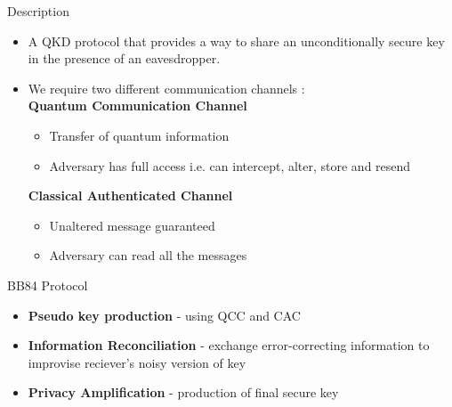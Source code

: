 \documentclass{beamer}
\begin{document}
\begin{frame}{Description}
    \begin{itemize}
        \item A QKD protocol that provides a way to share an unconditionally secure key in the presence of an eavesdropper.\\
        \item We require two different communication channels : \\
            \textbf{Quantum Communication Channel} \\
            \begin{itemize}
                \item Transfer of quantum information
                \item Adversary has full access i.e. can intercept, alter, store and resend
            \end{itemize}
            \textbf{Classical Authenticated Channel} \\
            \begin{itemize}
                \item Unaltered message guaranteed
                \item Adversary can read all the messages
            \end{itemize}
    \end{itemize}
\end{frame}

\begin{frame}{BB84 Protocol}
    \begin{itemize}[<+->]
        \item \textbf{Pseudo key production} -  using QCC and CAC
        \item \textbf{Information Reconciliation} - exchange error-correcting information to improvise reciever's noisy version of key
        \item \textbf{Privacy Amplification} -  production of final secure key 
    \end{itemize}
\end{frame}
\end{document}
